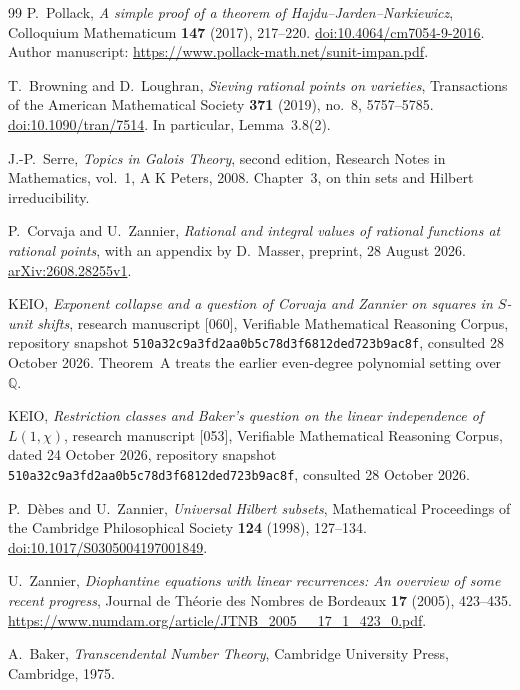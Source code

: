 \documentclass[11pt,a4paper]{article}
\theoremstyle{definition}
\theoremstyle{remark}
\newcommand{\Q}{\mathbb Q}
\begin{document}
\clearpage
\begin{thebibliography}{99}
P.~Pollack,
\emph{A simple proof of a theorem of Hajdu--Jarden--Narkiewicz},
Colloquium Mathematicum \textbf{147} (2017), 217--220.
\href{https://doi.org/10.4064/cm7054-9-2016}{doi:10.4064/cm7054-9-2016}.
Author manuscript: \url{https://www.pollack-math.net/sunit-impan.pdf}.

T.~Browning and D.~Loughran,
\emph{Sieving rational points on varieties},
Transactions of the American Mathematical Society \textbf{371} (2019),
no.~8, 5757--5785.
\href{https://doi.org/10.1090/tran/7514}{doi:10.1090/tran/7514}.
In particular, Lemma~3.8(2).

J.-P.~Serre,
\emph{Topics in Galois Theory}, second edition,
Research Notes in Mathematics, vol.~1, A K Peters, 2008.
Chapter~3, on thin sets and Hilbert irreducibility.

P.~Corvaja and U.~Zannier,
\emph{Rational and integral values of rational functions at rational points},
with an appendix by D.~Masser, preprint, 28 August 2026.
\href{https://arxiv.org/abs/2608.28255v1}{arXiv:2608.28255v1}.

KEIO,
\emph{Exponent collapse and a question of Corvaja and Zannier on squares
in $S$-unit shifts}, research manuscript [060],
Verifiable Mathematical Reasoning Corpus,
repository snapshot \texttt{510a32c9a3fd2aa0b5c78d3f6812ded723b9ac8f},
consulted 28 October 2026.
Theorem~A treats the earlier even-degree polynomial setting over $\Q$.

KEIO,
\emph{Restriction classes and Baker's question on the linear independence
of $L(1,\chi)$}, research manuscript [053],
Verifiable Mathematical Reasoning Corpus, dated 24 October 2026,
repository snapshot \texttt{510a32c9a3fd2aa0b5c78d3f6812ded723b9ac8f},
consulted 28 October 2026.

P.~D\`ebes and U.~Zannier,
\emph{Universal Hilbert subsets},
Mathematical Proceedings of the Cambridge Philosophical Society
\textbf{124} (1998), 127--134.
\href{https://doi.org/10.1017/S0305004197001849}{doi:10.1017/S0305004197001849}.

U.~Zannier,
\emph{Diophantine equations with linear recurrences: An overview of some recent progress},
Journal de Th\'eorie des Nombres de Bordeaux \textbf{17} (2005), 423--435.
\url{https://www.numdam.org/article/JTNB_2005__17_1_423_0.pdf}.

A.~Baker, \emph{Transcendental Number Theory},
Cambridge University Press, Cambridge, 1975.


\end{thebibliography}
\end{document}
